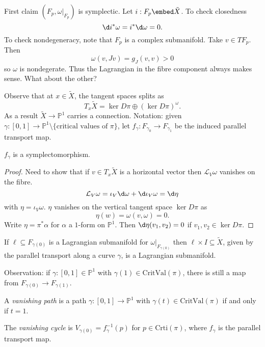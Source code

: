\documentclass[a4paper]{article}
\renewcommand*{\P}{\mathbb{P}}
\begin{document}
First claim \((F_p, \omega|_{F_p})\) is symplectic. Let \(i: F_p \embed \tilde X\). To check closedness
\[
  \d i^*\omega = i^* \d \omega = 0.
\]
To check nondegeneracy, note that \(F_p\) is a complex submanifold. Take \(v \in TF_p\). Then
\[
  \omega(v, Jv) = g_J(v, v) > 0
\]
so \(\omega\) is nondegerate. Thus the Lagrangian in the fibre component always makes sense. What about the other?

Observe that at \(x \in \tilde X\), the tangent spaces splits as
\[
  T_x \tilde X = \ker D\pi \oplus (\ker D\pi)^\omega.
\]
As a result \(\tilde X \to \P^1\) carries a connection. Notation: given \(\gamma: [0, 1] \to \P^1 \setminus \{\text{critical values of } \pi\}\), let \(f_\gamma: F_{\gamma_0} \to F_{\gamma_1}\) be the induced parallel transport map.

\begin{theorem}
  \(f_\gamma\) is a symplectomorphism.
\end{theorem}

\begin{proof}
  Need to show that if \(v \in T_x \tilde X\) is a horizontal vector then \(\mathcal L_V \omega\) vanishes on the fibre.
  \[
    \mathcal L_V \omega = \iota_V \d \omega + \d \iota_V \omega = \d \eta
  \]
  with \(\eta = \iota_V \omega\). \(\eta\) vanishes on the vertical tangent space \(\ker D\pi\) as
  \[
    \eta(w) = \omega(v, \omega) = 0.
  \]
  Write \(\eta = \pi^*\alpha\) for \(\alpha\) a \(1\)-form on \(\P^1\). Then \(\d \eta(v_1, v_2) = 0\) if \(v_1, v_2 \in \ker D\pi\).
\end{proof}

\begin{corollary}
  If \(\ell \subseteq F_{\gamma(0)}\) is a Lagrangian submanifold for \(\omega|_{F_{\gamma(0)}}\) then \(\ell \times I \subseteq \tilde X\), given by the parallel transport along a curve \(\gamma\), is a Lagrangian submanifold.
\end{corollary}

Observation: if \(\gamma: [0, 1] \in \P^1\) with \(\gamma(1) \in \mathrm{CritVal}(\pi)\), there is still a map from \(F_{\gamma(0)} \to F_{\gamma(1)}\).

\begin{definition}
  A \emph{vanishing path} is a path \(\gamma: [0, 1] \to \P^1\) with \(\gamma(t) \in \mathrm{CritVal}(\pi)\) if and only if \(t = 1\).

  The \emph{vanishing cycle} is \(V_{\gamma(0)} = f_\gamma^{-1}(p)\) for \(p \in \mathrm{Crti}(\pi)\), where \(f_\gamma\) is the parallel transport map.
\end{definition}
\end{document}
